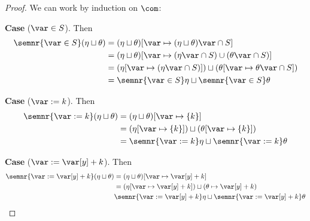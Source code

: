 \begin{proof}
  We can work by induction on \(\com\):

  \medskip
  
  \noindent
  \textbf{Case}  (\(\var \in S\)).
  Then
  \begin{align*}
    \semnr{\var \in S}(\eta \sqcup \theta) & = (\eta \sqcup \theta)[\var \mapsto (\eta \sqcup \theta)\var \cap S] \\
                                           & = (\eta \sqcup \theta)[\var \mapsto (\eta\var \cap S) \cup (\theta\var \cap S)] \\
                                           & = (\eta[\var \mapsto (\eta\var \cap S)]) \sqcup (\theta[\var \mapsto \theta\var \cap S]) \\
                                           & = \semnr{\var \in S}\eta \sqcup \semnr{\var \in S}\theta
  \end{align*}
    
  \medskip

  \noindent
  \textbf{Case}  (\(\var := k\)).
  Then
  \begin{align*}
    \semnr{\var := k}(\eta \sqcup \theta) & = (\eta \sqcup \theta)[\var \mapsto \{k\}] \\
                                          & = (\eta[\var \mapsto \{k\}]) \sqcup (\theta[\var \mapsto \{k\}]) \\
                                          & = \semnr{\var := k}\eta \sqcup \semnr{\var := k}\theta
  \end{align*}

  \medskip

  \noindent
  \textbf{Case}  (\(\var := \var[y] + k\)).
  Then
  \begin{align*}
    \semnr{\var := \var[y] + k}(\eta \sqcup \theta) & = (\eta \sqcup \theta)[\var \mapsto \var[y] + k] \\
                                                    & = (\eta[\var \mapsto \var[y] + k]) \sqcup (\theta \mapsto \var[y] + k) \\
                                                    & \semnr{\var := \var[y] + k}\eta \sqcup \semnr{\var := \var[y] + k}\theta
  \end{align*}


\end{proof}
